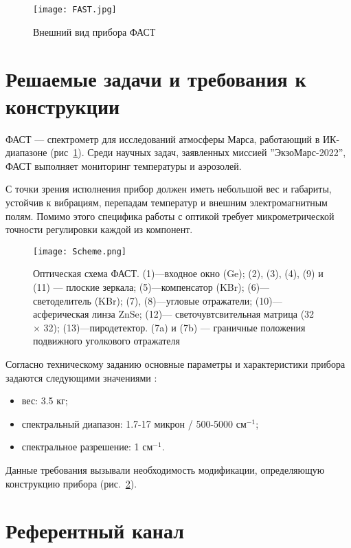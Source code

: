 \documentclass{mipt-thesis-bs}
\begin{document}
\begin{figure}[h]
	\centering
	\texttt{[image: FAST.jpg]}
	\caption{Внешний вид прибора ФАСТ}
	\label{fig_FASTexterior}
\end{figure}
\section{Решаемые задачи и требования к конструкции}

ФАСТ --- спектрометр для исследований атмосферы Марса, работающий в ИК-диапазоне (рис~\ref{fig_FASTexterior}). Среди научных задач, заявленных миссией ''ЭкзоМарс-2022'', ФАСТ выполняет мониторинг температуры и аэрозолей.

 С точки зрения исполнения прибор должен иметь небольшой вес и габариты, устойчив к вибрациям, перепадам температур и внешним электромагнитным полям. Помимо этого специфика работы с оптикой требует микрометрической точности регулировки каждой из компонент.


\begin{figure}[h!]
	\centering
	\texttt{[image: Scheme.png]}
	\caption{Оптическая схема ФАСТ. (1)—входное
		окно (Ge); (2), (3), (4), (9) и (11) — плоские зеркала; (5)—компенсатор (KBr);
		(6)—светоделитель (KBr); (7),
		(8)—угловые отражатели;
		(10)—асферическая линза ZnSe; (12)—
		светочувтсвительная матрица (32 × 32);
		(13)—пиродетектор. (7a)
		и (7b) — граничные положения
		подвижного уголкового отражателя}
	\label{fig_FASToptical}
\end{figure}


Согласно техническому заданию основные параметры и характеристики прибора задаются следующими значениями \cite{shakun2017fourier}:
\begin{itemize}
	\item вес: 3.5 кг;
	\item спектральный диапазон: 1.7-17 микрон / 500-5000 $см^{-1}$; 
	\item спектральное разрешение: 1 $см^{-1}$.
\end{itemize}

Данные требования вызывали необходимость модификации, определяющую конструкцию прибора (рис.~\ref{fig_FASToptical}). 




\section{Референтный канал}
	
\end{document}
